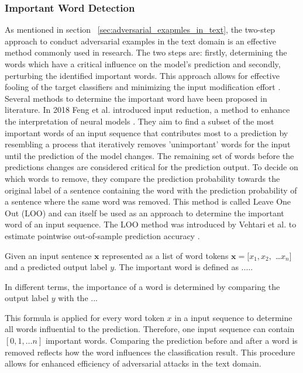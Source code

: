 \subsubsection{Important Word Detection}
\label{sec:iwd_method}
As mentioned in section ~\ref{sec:adversarial_exapmles_in_text}, the two-step approach to conduct adversarial examples in the text domain is an effective method commonly used in research. The two steps are: firstly, determining the words which have a critical influence on the model's prediction and secondly, perturbing the identified important words. This approach allows for effective fooling of the target classifiers and minimizing the input modification effort \cite{jin2019bert}. Several methods to determine the important word have been proposed in literature.
In 2018 Feng et al. introduced input reduction, a method to enhance the interpretation of neural models \cite{feng2018pathologies}. They aim to find a subset of the most important words of an input sequence that contributes most to a prediction by resembling a process that iteratively removes 'unimportant' words for the input until the prediction of the model changes. The remaining set of words before the predictions changes are considered critical for the prediction output. To decide on which words to remove, they compare the prediction probability towards the original label of a sentence containing the word with the prediction probability of a sentence where the same word was removed. This method is called Leave One Out (LOO) and can itself be used as an approach to determine the important word of an input sequence. The LOO method was introduced by Vehtari et al. to estimate pointwise out-of-sample prediction accuracy \cite{vehtari2017practical}. 

Given an input sentence $\textbf{x}$ represented as a list of word tokens ${\textbf{x} = [x_1, x_2,}$ \dots${x_n]}$ and a predicted output label $y$. The important word is defined as 
.....

In different terms, the importance of a word is determined by comparing the output label $y$ with the ...

This formula is applied for every word token $x$ in a input sequence to determine all words influential to the prediction. Therefore, one input sequence can contain $[0,1, \dots n]$ important words. 
Comparing the prediction before and after a word is removed reflects how the word influences the classification result. This procedure allows for enhanced efficiency of adversarial attacks in the text domain.

